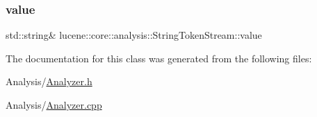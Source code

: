 \mbox{\label{classlucene_1_1core_1_1analysis_1_1StringTokenStream_a6fb3e249a092b3cd9b008449d256b6a8}} 
\subsubsection{\texorpdfstring{value}{value}}
{\footnotesize\ttfamily std\+::string\& lucene\+::core\+::analysis\+::\+String\+Token\+Stream\+::value\hspace{0.3cm}{\ttfamily [private]}}



The documentation for this class was generated from the following files\+:\begin{DoxyCompactItemize}
\item 
Analysis/\mbox{\hyperlink{Analyzer_8h}{Analyzer.\+h}}\item 
Analysis/\mbox{\hyperlink{Analyzer_8cpp}{Analyzer.\+cpp}}\end{DoxyCompactItemize}
